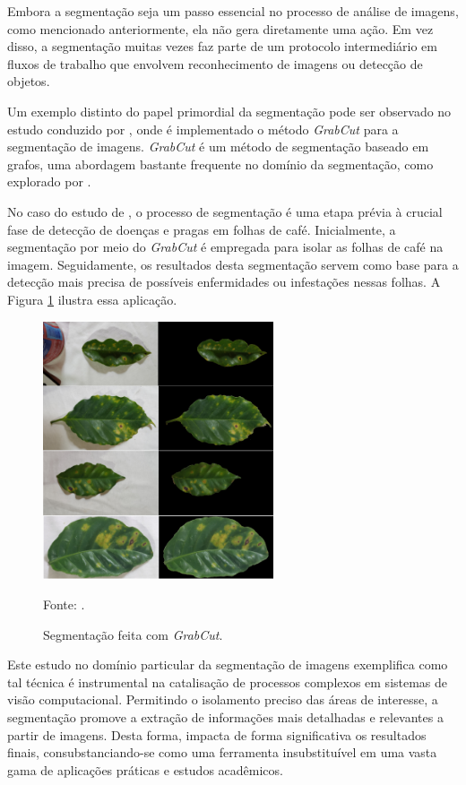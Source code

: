 Embora a segmentação seja um passo essencial no processo de análise de imagens, como mencionado anteriormente, ela não gera diretamente uma ação. Em vez disso, a segmentação muitas vezes faz parte de um protocolo intermediário em fluxos de trabalho que envolvem reconhecimento de imagens ou detecção de objetos.

Um exemplo distinto do papel primordial da segmentação pode ser observado no estudo conduzido por \cite{Carneiro2021}, onde é implementado o método \textit{GrabCut} \citep{rother2004grabcut} para a segmentação de imagens. \textit{GrabCut} é um método de segmentação baseado em grafos, uma abordagem bastante frequente no domínio da segmentação, como explorado por \cite{Yi2012}.

No caso do estudo de \cite{Carneiro2021}, o processo de segmentação é uma etapa prévia à crucial fase de detecção de doenças e pragas em folhas de café. Inicialmente, a segmentação por meio do \textit{GrabCut} é empregada para isolar as folhas de café na imagem. Seguidamente, os resultados desta segmentação servem como base para a detecção mais precisa de possíveis enfermidades ou infestações nessas folhas. A Figura \ref{intro:fig:3} ilustra essa aplicação.

\begin{figure}[H]
    \centering
    \caption{Segmentação feita com \textit{GrabCut}.}
    \includegraphics[height=3in]{recursos/imagens/introduction/grabcut.png}

    \label{intro:fig:3}

    Fonte: \cite{Carneiro2021}.
\end{figure}

Este estudo no domínio particular da segmentação de imagens exemplifica como tal técnica é instrumental na catalisação de processos complexos em sistemas de visão computacional. Permitindo o isolamento preciso das áreas de interesse, a segmentação promove a extração de informações mais detalhadas e relevantes a partir de imagens. Desta forma, impacta de forma significativa os resultados finais, consubstanciando-se como uma ferramenta insubstituível em uma vasta gama de aplicações práticas e estudos acadêmicos.

